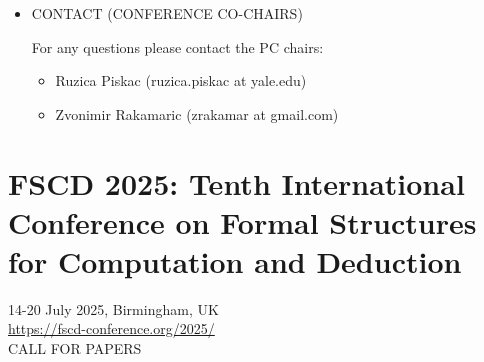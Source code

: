 \documentclass[prodmode,acmtecs]{acmsmall} %
\begin{document}
\begin{itemize}
\item  CONTACT (CONFERENCE CO-CHAIRS) 
 
  For any questions please contact the PC chairs: 
 
\begin{itemize}\item  Ruzica Piskac (ruzica.piskac at yale.edu)    
\item  Zvonimir Rakamaric (zrakamar at gmail.com)
\end{itemize} 
\end{itemize}\section{FSCD 2025:  Tenth International Conference on Formal Structures for Computation and Deduction}\label{FSCD2025}  14-20 July 2025, Birmingham, UK\\ 
  \href{https://fscd-conference.org/2025/}{https://fscd-conference.org/2025/}\\ 
CALL FOR PAPERS 
\end{document}
